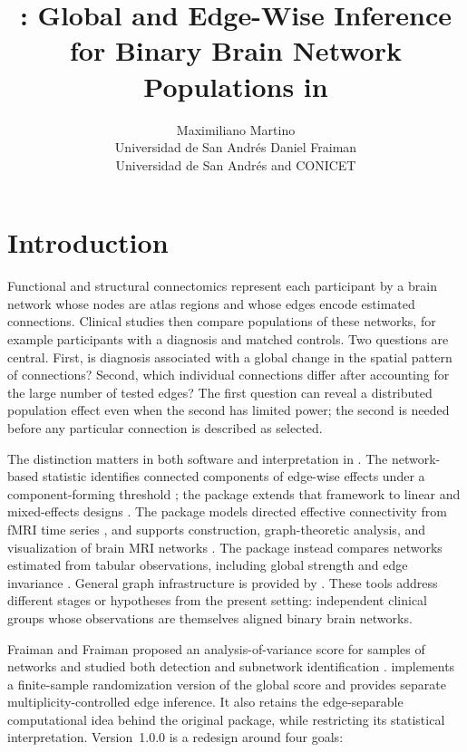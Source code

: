 \documentclass[article]{jss}\usepackage[]{graphicx}\usepackage[]{xcolor}
\author{
  Maximiliano Martino\\Universidad de San Andr\'es
  \And
  Daniel Fraiman\\Universidad de San Andr\'es and CONICET
}
\title{\pkg{BrainNetTest}: Global and Edge-Wise Inference for Binary
  Brain Network Populations in \proglang{R}}
\begin{document}
\maketitle

\section{Introduction}

Functional and structural connectomics represent each participant by a brain
network whose nodes are atlas regions and whose edges encode estimated
connections. Clinical studies then compare populations of these networks, for
example participants with a diagnosis and matched controls. Two questions are
central. First, is diagnosis associated with a global change in the spatial
pattern of connections? Second, which individual connections differ after
accounting for the large number of tested edges? The first question can reveal
a distributed population effect even when the second has limited power; the
second is needed before any particular connection is described as selected.

The distinction matters in both software and interpretation in
 \citep{R}. The
network-based statistic identifies connected components of edge-wise effects
under a component-forming threshold \citep{Zalesky2010}; the 
package extends that framework to linear and mixed-effects designs
\citep{GraciaTabuenca2020}. The  package models directed effective
connectivity from fMRI time series \citep{FIAR}, and  supports
construction, graph-theoretic analysis, and visualization of brain MRI
networks \citep{brainGraph}. The  package instead
compares networks estimated from tabular observations, including global
strength and edge invariance \citep{vanBorkulo2021}. General graph
infrastructure is provided by  \citep{igraph}. These tools address
different stages or hypotheses from the present setting: independent clinical
groups whose observations are themselves aligned binary brain networks.

Fraiman and Fraiman proposed an analysis-of-variance score for samples of
networks and studied both detection and subnetwork identification
\citep{fraiman}.  implements a finite-sample randomization
version of the global score and provides separate multiplicity-controlled edge
inference. It also retains the edge-separable computational idea behind the
original package, while restricting its statistical interpretation.
Version~1.0.0 is a redesign around four goals:
\end{document}
